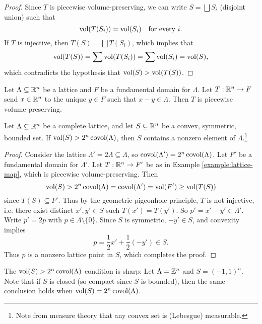 \begin{proof}
  Since $T$ is piecewise volume-preserving, we can
  write $S = \bigsqcup S_i$ (disjoint union) such that
  \[
    \operatorname{vol}(T(S_i)) = \operatorname{vol}(S_i) \quad \text{for every } i.
  \]
  If $T$ is injective, then $T(S) = \bigsqcup T(S_i)$,
  which implies that
  \[\operatorname{vol}(T(S)) = \sum \operatorname{vol}(T(S_i)) = \sum \operatorname{vol}(S_i) = \operatorname{vol}(S),\]
  which contradicts the hypothesis that
  $\operatorname{vol}(S) > \operatorname{vol}(T(S))$.
\end{proof}

\begin{example}\label{example:lattice-map}
  Let $\Lambda \subseteq \mathbb{R}^n$ be a lattice and
  $F$ be a fundamental domain for $\Lambda$. Let
  $T : \mathbb{R}^n \to F$ send $x \in \mathbb{R}^n$ to the
  unique $y \in F$ such that $x - y \in \Lambda$.
  Then $T$ is piecewise volume-preserving.
\end{example}

\begin{theorem}
  Let $\Lambda \subseteq \mathbb{R}^n$ be a complete lattice,
  and let $S \subseteq \mathbb{R}^n$ be a convex, symmetric,
  bounded set. If
  $\operatorname{vol}(S) > 2^n \operatorname{covol}(\Lambda)$, then
  $S$ contains a nonzero element of $\Lambda$.\footnote{Note from measure theory that any convex set is (Lebesgue) measurable.}
\end{theorem}

\begin{proof}
  Consider the lattice $\Lambda' = 2\Lambda \subseteq \Lambda$, so
  $\operatorname{covol}(\Lambda') = 2^n \operatorname{covol}(\Lambda)$. Let
  $F'$ be a fundamental domain for $\Lambda'$. Let
  $T : \mathbb{R}^n \to F'$ be as in Example \ref{example:lattice-map},
  which is piecewise volume-preserving. Then
  \[
    \operatorname{vol}(S) > 2^n \operatorname{covol}(\Lambda) = \operatorname{covol}(\Lambda')
    = \operatorname{vol}(F') \ge \operatorname{vol}(T(S))
  \]
  since $T(S) \subseteq F'$. Thus by the geometric
  pigeonhole principle, $T$ is not injective, i.e.
  there exist distinct
  $x', y' \in S$ such $T(x') = T(y')$.
  So $p' = x' - y' \in \Lambda'$. Write $p' = 2p$
  with $p \in \Lambda \setminus \{0\}$. Since
  $S$ is symmetric, $-y' \in S$, and convexity implies
  \[
    p = \frac{1}{2}x' + \frac{1}{2}(-y') \in S.
  \]
  Thus $p$ is a nonzero lattice point in $S$, which
  completes the proof.
\end{proof}

\begin{remark}
  The $\operatorname{vol}(S) > 2^n \operatorname{covol}(\Lambda)$ condition is
  sharp: Let $\Lambda = \mathbb{Z}^n$ and
  $S = (-1, 1)^n$. Note that if $S$ is closed (so compact since
  $S$ is bounded), then the same conclusion holds
  when $\operatorname{vol}(S) = 2^n \operatorname{covol}(\Lambda)$.
\end{remark}

